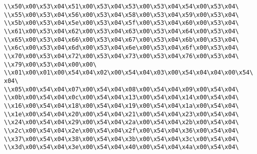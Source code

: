 \verb|\\x50\x00\x53\x04\x51\x00\x53\x04\x53\x00\x53\x04\x54\x00\x53\x04\|\newline
\verb|\\x55\x00\x53\x04\x56\x00\x53\x04\x58\x00\x53\x04\x59\x00\x53\x04\|\newline
\verb|\\x5b\x00\x53\x04\x5e\x00\x53\x04\x5f\x00\x53\x04\x60\x00\x53\x04\|\newline
\verb|\\x61\x00\x53\x04\x62\x00\x53\x04\x63\x00\x53\x04\x64\x00\x53\x04\|\newline
\verb|\\x65\x00\x53\x04\x66\x00\x53\x04\x67\x00\x53\x04\x6b\x00\x53\x04\|\newline
\verb|\\x6c\x00\x53\x04\x6d\x00\x53\x04\x6e\x00\x53\x04\x6f\x00\x53\x04\|\newline
\verb|\\x70\x00\x53\x04\x72\x00\x53\x04\x73\x00\x53\x04\x76\x00\x53\x04\|\newline
\verb|\\x79\x00\x53\x04\x00\x00\|\newline
\verb|\\x01\x00\x01\x00\x54\x04\x02\x00\x54\x04\x03\x00\x54\x04\x04\x00\x54\x04\|\newline
\verb|\\x05\x00\x54\x04\x07\x00\x54\x04\x08\x00\x54\x04\x09\x00\x54\x04\|\newline
\verb|\\x0b\x00\x54\x04\x0c\x00\x54\x04\x13\x00\x54\x04\x14\x00\x54\x04\|\newline
\verb|\\x16\x00\x54\x04\x18\x00\x54\x04\x19\x00\x54\x04\x1a\x00\x54\x04\|\newline
\verb|\\x1e\x00\x54\x04\x20\x00\x54\x04\x21\x00\x54\x04\x23\x00\x54\x04\|\newline
\verb|\\x24\x00\x54\x04\x29\x00\x54\x04\x2a\x00\x54\x04\x2b\x00\x54\x04\|\newline
\verb|\\x2c\x00\x54\x04\x2e\x00\x54\x04\x2f\x00\x54\x04\x36\x00\x54\x04\|\newline
\verb|\\x37\x00\x54\x04\x38\x00\x54\x04\x3b\x00\x54\x04\x3c\x00\x54\x04\|\newline
\verb|\\x3d\x00\x54\x04\x3e\x00\x54\x04\x40\x00\x54\x04\x4a\x00\x54\x04\|\newline
